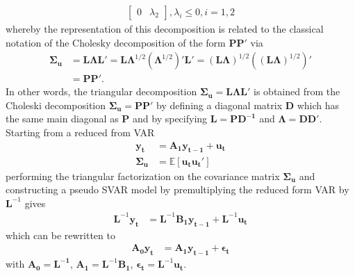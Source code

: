 \documentclass[a4paper,11pt,listof=nochaptergap,oneside,pointednumbers,bibtotoc,bigheadings,liststotoc]{scrbook}
\theoremstyle{mysatz}
\theoremstyle{mydefinition}
\theoremstyle{mybemerkung}
\newcommand{\vect}[1]{\boldsymbol{\mathbf{#1}}}
\begin{document}
\begin{itemize}
\begin{equation}
\begin{split}
\begin{bmatrix}
					0 & \lambda_2 
 					\end{bmatrix},
					\lambda_i \leq 0, i = 1, 2
\end{split}								
\end{equation}
whereby the representation of this decomposition is related to the classical notation of the Cholesky decomposition of the form $\vect{PP'}$ via
\begin{equation} \label{eq:svar17}
\begin{split}
	\vect{\Sigma_u} & = \vect{L}\vect{\Lambda}\vect{L}' = \vect{L}\vect{\Lambda}^{1/2}(\vect{\Lambda}^{1/2})'\vect{L}' = (\vect{L}\vect{\Lambda})^{1/2}\left ( (\vect{L}\vect{\Lambda})^{1/2}\right )' \\
				& = \vect{P}\vect{P'}.
\end{split}								
\end{equation}
In other words, the triangular decomposition $\vect{\Sigma_u} = \vect{L}\vect{\Lambda}\vect{L'}$ is obtained from the Choleski decomposition $\vect{\Sigma_u} = \vect{P}\vect{P'}$ by defining a diagonal matrix $\vect{D}$ which has the same main diagonal as $\vect{P}$ and by specifying $\vect{L} = \vect{P}\vect{D^{-1}}$ and $\vect{\Lambda} = \vect{D}\vect{D'}$.\\
Starting from a reduced from VAR
\begin{equation} \label{eq:svar18}
\begin{split}
	\vect{y_t} & = \vect{A_1}\vect{y_{t-1}} + \vect{u_t} \\
	\vect{\Sigma_u} & = \mathbb{E}[\vect{u_t}\vect{u_t}']
\end{split}								
\end{equation}
performing the triangular factorization on the covariance matrix $\vect{\Sigma_u}$ and constructing a pseudo SVAR model by premultiplying the reduced form VAR by $\vect{L}^{-1}$ gives
\begin{equation} \label{eq:svar19}
\begin{split}
	\vect{L}^{-1}\vect{y_t} & = \vect{L}^{-1}\vect{B_1}\vect{y_{t-1}} + \vect{L}^{-1}\vect{u_t}
\end{split}								
\end{equation}
which can be rewritten to
\begin{equation} \label{eq:svar21}
\begin{split}
	\vect{A_0}\vect{y_t} & = \vect{A_1}\vect{y_{t-1}} + \vect{\epsilon_t}
\end{split}								
\end{equation}
with $\vect{A_0} = \vect{L^{-1}}$, $\vect{A_1} = \vect{L}^{-1}\vect{B_1}$, $\vect{\epsilon_t} = \vect{L}^{-1}\vect{u_t}$.\\

\end{itemize}
\end{document}
